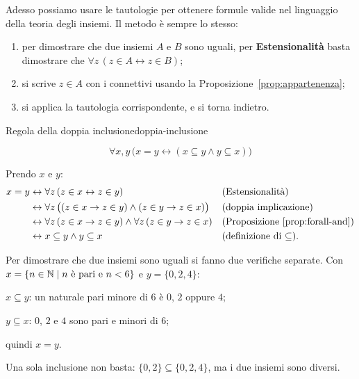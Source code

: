 Adesso possiamo usare le tautologie per ottenere formule valide nel linguaggio della teoria degli insiemi.
Il metodo è sempre lo stesso:
\begin{enumerate}
    \item per dimostrare che due insiemi $A$ e $B$ sono uguali, per \textbf{Estensionalità} basta dimostrare
          che $\forall z\,(z \in A \leftrightarrow z \in B)$;
    \item si scrive $z \in A$ con i connettivi usando la Proposizione~\ref{prop:appartenenza};
    \item si applica la tautologia corrispondente, e si torna indietro.
\end{enumerate}

\begin{concetto}
\begin{Proposizione}{Regola della doppia inclusione}{doppia-inclusione}
    \begin{prerequisiti}
    \end{prerequisiti}
    \[ \forall x, y\,\big(x = y \leftrightarrow (x \subseteq y \wedge y \subseteq x)\big) \]
\end{Proposizione}
\begin{dimostrazione}
    Prendo $x$ e $y$:
    \[
    \begin{aligned}
        x = y &\leftrightarrow \forall z\,(z \in x \leftrightarrow z \in y) && \text{(Estensionalità)}\\
        &\leftrightarrow \forall z\,\big((z \in x \rightarrow z \in y) \wedge (z \in y \rightarrow z \in x)\big) && \text{(doppia implicazione)}\\
        &\leftrightarrow \forall z\,(z \in x \rightarrow z \in y) \wedge \forall z\,(z \in y \rightarrow z \in x) && \text{(Proposizione~\ref{prop:forall-and})}\\
        &\leftrightarrow x \subseteq y \wedge y \subseteq x && \text{(definizione di $\subseteq$)}.
    \end{aligned}
    \]
\end{dimostrazione}
\end{concetto}

\begin{spiegazione}
    Per dimostrare che due insiemi sono uguali si fanno due verifiche separate. Con $x = \{n \in \mathbb{N} \mid n \text{ è pari e } n < 6\}$ e $y = \{0, 2, 4\}$:
    \begin{passi}
        \item $x \subseteq y$: un naturale pari minore di $6$ è $0$, $2$ oppure $4$;
        \item $y \subseteq x$: $0$, $2$ e $4$ sono pari e minori di $6$;
        \item quindi $x = y$.
    \end{passi}
    Una sola inclusione non basta: $\{0, 2\} \subseteq \{0, 2, 4\}$, ma i due insiemi sono diversi.
\end{spiegazione}


